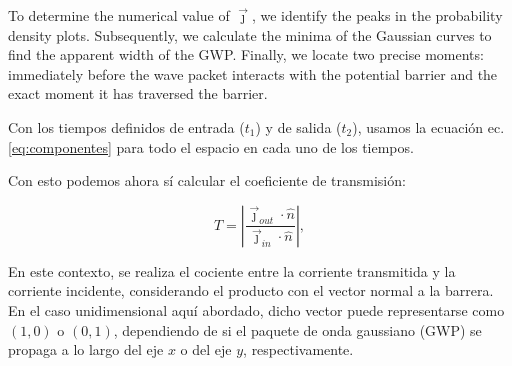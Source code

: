     To determine the numerical value of $\vec{\jmath}$, we identify the peaks in the probability density plots.
    Subsequently, we calculate the minima of the Gaussian curves to find the apparent width of the GWP. Finally, we locate two precise moments: immediately before the wave packet interacts with the potential barrier and the exact moment it has traversed the barrier.

    Con los tiempos definidos de entrada ($t_1$) y de salida ($t_2$), usamos la ecuación ec.\eqref{eq:componentes} para todo el espacio en cada uno de los tiempos. 
    
    Con esto podemos ahora sí calcular el coeficiente de transmisión:
    
    \begin{equation}
        \label{eq:transmissionCoef}
        T = \left| \frac{\vec{\jmath}_{out}\cdot\hat{n}}{\vec{\jmath}_{in}\cdot\hat{n}} \right|,
    \end{equation}

    \noindent En este contexto, se realiza el cociente entre la corriente transmitida y la corriente incidente, considerando el producto con el vector normal a la barrera.
    En el caso unidimensional aquí abordado, dicho vector puede representarse como $(1,0)$ o $(0,1)$, dependiendo de si el paquete de onda gaussiano (GWP) se propaga a lo largo del eje $x$ o del eje $y$, respectivamente.
